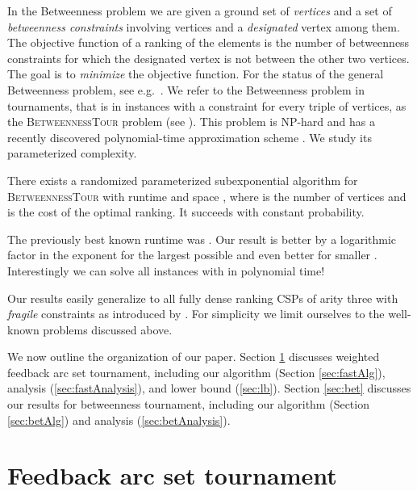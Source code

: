 \documentclass[envcountsame,oribibl]{llncs}
\newcommand{\betTour}{\textsc{BetweennessTour}}
\begin{document}
\bigskip

In the Betweenness problem we are given a ground set of \emph{vertices} and a set of \emph{betweenness constraints}
involving  vertices and a \emph{designated} vertex among them.
The objective function of a ranking of the elements is the number of betweenness constraints
for which the designated vertex is not between the other two vertices. The goal is to
\emph{minimize} the objective function. 
For the status of the general Betweenness
problem, see e.g.\ \cite{Opatrny79,Chor98,Ailon07hardness,Charikar09}.
We refer to the Betweenness problem in tournaments, that is in instances with a constraint for every triple of vertices,
as the \betTour{} problem (see \cite{Ailon07hardness}). This problem is NP-hard \cite{Ailon07hardness} and has a recently discovered polynomial-time approximation scheme \cite{Karpinski09betweenness}. We study its parameterized complexity.

\begin{theorem} \label{thm:exactGen}
There exists a randomized parameterized subexponential
   algorithm for \betTour{} with runtime and space , where  is the number of vertices and  is the cost of the optimal ranking. It succeeds with constant probability.
\end{theorem}

The previously best known runtime was  \cite{Saurabh09}. Our result is better by a logarithmic factor in the exponent for the largest possible  and even better for smaller . Interestingly we can solve all instances with  in polynomial time!

Our results easily generalize to all fully dense ranking CSPs of arity three with \emph{fragile} constraints as introduced by \cite{Karpinski09betweenness}. For simplicity we limit ourselves to the well-known problems discussed above.

\medskip

We now outline the organization of our paper. Section \ref{sec:fast} discusses weighted feedback arc set tournament, including our algorithm (Section \ref{sec:fastAlg}), analysis (\ref{sec:fastAnalysis}), and lower bound (\ref{sec:lb}). Section \ref{sec:bet} discusses our results for betweenness tournament, including our algorithm (Section \ref{sec:betAlg}) and analysis (\ref{sec:betAnalysis}).

\section{Feedback arc set tournament} \label{sec:fast}
\end{document}
